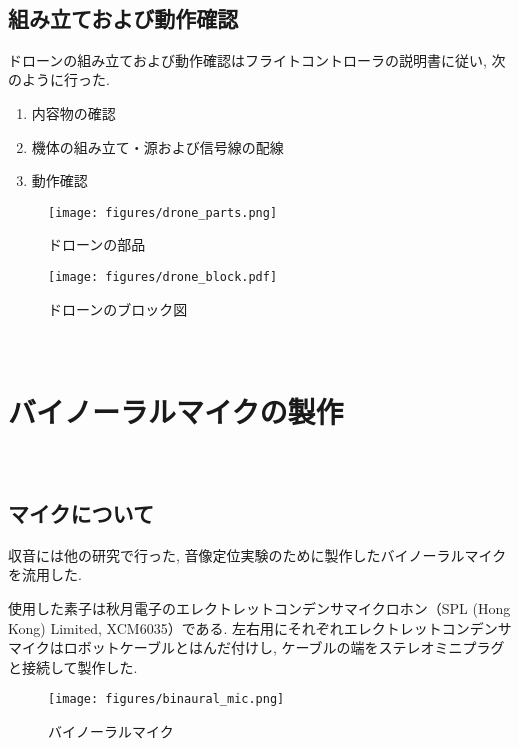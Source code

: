 \
\subsection{組み立ておよび動作確認}\label{assembly-drone}

ドローンの組み立ておよび動作確認はフライトコントローラの説明書\cite{quadrino_nano_instruction:online}に従い, 次のように行った. 

\begin{enumerate}
\renewcommand{\labelenumi}{(\arabic{enumi})}
\item
  内容物の確認
\item
  機体の組み立て・源および信号線の配線
\item
  動作確認
\end{enumerate}

\begin{figure}[H]
\centering
\texttt{[image: figures/drone\_parts.png]}
\caption{ドローンの部品}
\label{fig:drone_parts}
\end{figure}

\begin{figure}[H]
\centering
\texttt{[image: figures/drone\_block.pdf]}
\caption{ドローンのブロック図}
\label{fig:drone_block}
\end{figure}

\newpage

\
\section{バイノーラルマイクの製作}\label{binaural-mic}

\
\subsection{マイクについて}\label{about-mic}

収音には他の研究で行った, 音像定位実験のために製作したバイノーラルマイクを流用した. 

使用した素子は秋月電子のエレクトレットコンデンサマイクロホン（SPL (Hong Kong) Limited, XCM6035）である. 左右用にそれぞれエレクトレットコンデンサマイクはロボットケーブルとはんだ付けし, ケーブルの端をステレオミニプラグと接続して製作した. 

  \begin{figure}[H]
    \centering
    \texttt{[image: figures/binaural\_mic.png]}
    \caption{バイノーラルマイク}
    \label{fig:binaural_mic}
  \end{figure}

